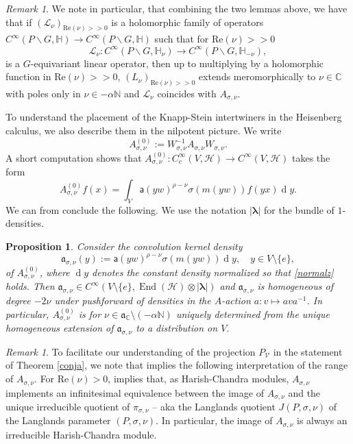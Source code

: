 \documentclass[a4paper,reqno]{amsart}
\numberwithin{equation}{section}
\def\End{\operatorname{End}}
\def\rd{\operatorname{d}\!}
\def\C{\mathbb{C}}
\def\N{\mathbb{N}}
\newtheorem{prop}[thm]{Proposition}
\theoremstyle{definition}
\theoremstyle{remark}
\newtheorem{remark}[thm]{Remark}
\begin{document}
\begin{remark}
\label{lknkanda}
We note in particular, that combining the two lemmas above, we have that if $(\mathcal{L}_\nu)_{\mathrm{Re}(\nu)>> 0}$ is a holomorphic family of operators $C^\infty(P\backslash G,\mathbb{H})\to C^\infty(P\backslash G,\mathbb{H})$ such that for $\mathrm{Re}(\nu)>> 0$
$$\mathcal{L}_\nu:C^\infty(P\backslash G,\mathbb{H}_\nu)\to C^\infty(P\backslash G,\mathbb{H}_{-\nu}),$$
is a $G$-equivariant linear operator, then up to multiplying by a holomorphic function in $\mathrm{Re}(\nu)>> 0$, $(L_\nu)_{\mathrm{Re}(\nu)>> 0}$ extends meromorphically to $\nu \in \C$ with poles only in $\nu\in -\alpha \N$ and $\mathcal{L}_\nu$ coincides with $A_{\sigma,\nu}$.
\end{remark}

To understand the placement of the Knapp-Stein intertwiners in the Heisenberg calculus, we also describe them in the nilpotent picture. We write 
$$A_{\sigma,\nu}^{(0)}:=W_{\sigma,\nu}^{-1}A_{\sigma,\nu}W_{\sigma,\nu}.$$
A short computation shows that $A_{\sigma,\nu}^{(0)}:C^\infty_c(V,\mathcal{H})\to C^\infty(V,\mathcal{H})$ takes the form
$$A_{\sigma,\nu}^{(0)}f(x)=\int_V\mathsf{a}(yw)^{\rho-\nu}\sigma(m(yw))f(yx)\rd y.$$
We can from \cite[Lemma 19]{knappstein} conclude the following. We use the notation $|\pmb{\lambda}|$ for the bundle of $1$-densities.


\begin{prop}
\label{lknlajndljadn}
Consider the convolution kernel density
$$\mathfrak{a}_{\sigma,\nu}(y):=\mathsf{a}(yw)^{\rho-\nu}\sigma(m(yw))\rd y, \quad y\in V\setminus \{e\},$$
of $A_{\sigma,\nu}^{(0)}$, where $\rd y$ denotes the constant density normalized so that \eqref{normalz} holds. Then $\mathfrak{a}_{\sigma,\nu}\in C^\infty(V\setminus \{e\},\End(\mathcal{H})\otimes |\pmb{\lambda}|)$ and $\mathfrak{a}_{\sigma,\nu}$ is homogeneous of degree $-2\nu$ under pushforward of densities in the $A$-action $a:v\mapsto ava^{-1}$. In particular, $A_{\sigma,\nu}^{(0)}$ is for $\nu\in \mathfrak{a}_\C\setminus (-\alpha\N)$ uniquely determined from the unique homogeneous extension of $\mathfrak{a}_{\sigma,\nu}$ to a distribution on $V$.
\end{prop}


\begin{remark}
\label{langlandsrem}
To facilitate our understanding of the projection $P_{\mathcal{V}}$ in the statement of Theorem \ref{conja}, we note that \cite[Theorem 7.24]{knappbook} implies the following interpretation of the range of $A_{\sigma,\nu}$. For  $\mathrm{Re}(\nu)> 0$, \cite[Theorem 7.24]{knappbook} implies that, as Harish-Chandra modules, $A_{\sigma,\nu}$ implements an infinitesimal equivalence between the image of $A_{\sigma,\nu}$ and the unique irreducible quotient of $\pi_{\sigma,\nu}$ -- aka the Langlands quotient $J(P,\sigma,\nu)$ of the Langlands parameter $(P,\sigma,\nu)$. In particular, the image of $A_{\sigma,\nu}$ is always an irreducible Harish-Chandra module.
\end{remark}
\end{document}
